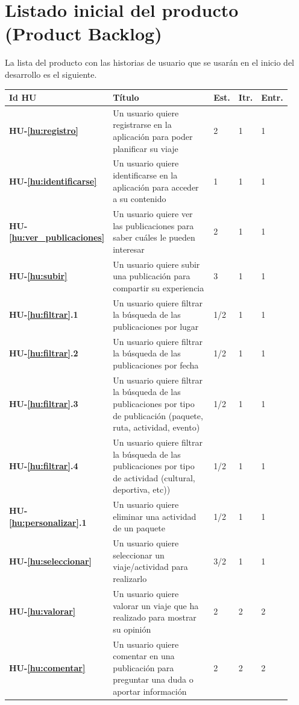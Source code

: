 \documentclass[11pt]{article}
\begin{document}
\section{Listado inicial del producto (Product Backlog)}
La lista del producto con las historias de usuario que se usarán en el inicio del desarrollo es el siguiente.

 \begin{longtable}{p{0.13\linewidth}p{0.65\linewidth}p{0.05\linewidth}p{0.05\linewidth}p{0.05\linewidth}}
	\toprule
	\textbf{Id HU} & \textbf{Título} & \textbf{Est.} & \textbf{Itr.} & \textbf{Entr.}\\
	\midrule
	\textbf{HU-\ref{hu:registro}} & Un usuario quiere registrarse en la aplicación para poder planificar su viaje & 2  & 1 & 1\\
	\textbf{HU-\ref{hu:identificarse}} & Un usuario quiere identificarse en la aplicación para  acceder a su contenido & 1 & 1 & 1\\
	\textbf{HU-\ref{hu:ver_publicaciones}} & Un usuario quiere ver las publicaciones para saber cuáles le pueden interesar & 2 & 1 & 1\\
	\textbf{HU-\ref{hu:subir}} & Un usuario quiere subir una publicación para compartir su experiencia & 3 & 1 & 1\\
	\textbf{HU-\ref{hu:filtrar}.1} & Un usuario quiere filtrar la búsqueda de las publicaciones por lugar & 1/2 & 1 & 1\\ 
	\textbf{HU-\ref{hu:filtrar}.2} & Un usuario quiere filtrar la búsqueda de las publicaciones por fecha & 1/2 & 1 & 1\\ 
	\textbf{HU-\ref{hu:filtrar}.3} & Un usuario quiere filtrar la búsqueda de las publicaciones por tipo de publicación (paquete, ruta, actividad, evento) & 1/2 & 1 & 1\\ 
	\textbf{HU-\ref{hu:filtrar}.4} & Un usuario quiere filtrar la búsqueda de las publicaciones por tipo de actividad (cultural, deportiva, etc)) & 1/2 & 1 & 1\\ 
	\textbf{HU-\ref{hu:personalizar}.1} & Un usuario quiere eliminar una actividad de un paquete & 1/2 & 1 & 1\\ 
	\textbf{HU-\ref{hu:seleccionar}} & Un usuario quiere seleccionar un viaje/actividad para realizarlo & 3/2 & 1 & 1\\ 
	\textbf{HU-\ref{hu:valorar}} & Un usuario quiere valorar un viaje que ha realizado para mostrar su opinión & 2 & 2 & 2\\
	\textbf{HU-\ref{hu:comentar}} & Un usuario quiere comentar en una publicación para preguntar una duda o aportar información & 2 & 2 & 2\\ 

\end{longtable}
\end{document}

